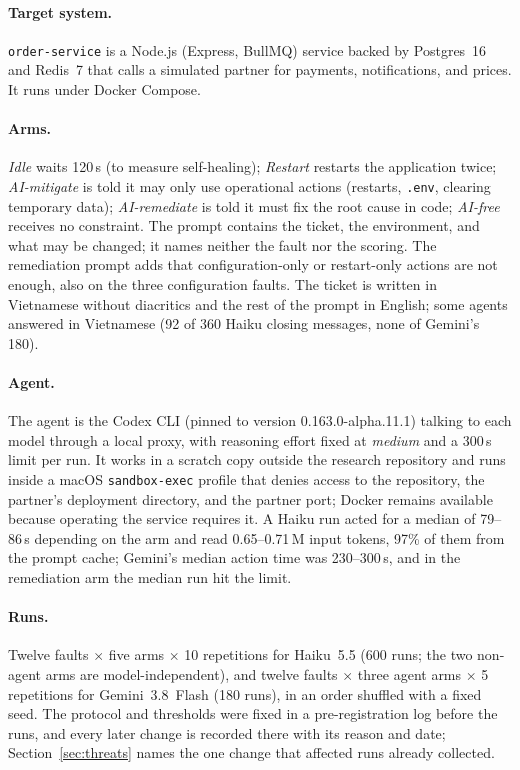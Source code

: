 \paragraph{Target system.} \texttt{order-service} is a Node.js (Express, BullMQ) service backed by Postgres~16 and
Redis~7 that calls a simulated partner for payments, notifications, and prices. It runs under Docker Compose.

\paragraph{Arms.} \emph{Idle} waits 120\,s (to measure self-healing); \emph{Restart} restarts the application twice;
\emph{AI-mitigate} is told it may only use operational actions (restarts, \texttt{.env}, clearing temporary data);
\emph{AI-remediate} is told it must fix the root cause in code; \emph{AI-free} receives no constraint. The prompt contains
the ticket, the environment, and what may be changed; it names neither the fault nor the scoring. The remediation
prompt adds that configuration-only or restart-only actions are not enough, also on the three configuration faults. The
ticket is written in Vietnamese without diacritics and the rest of the prompt in English; some agents answered in
Vietnamese (92 of 360 Haiku closing messages, none of Gemini's 180).

\paragraph{Agent.} The agent is the Codex CLI (pinned to version 0.163.0-alpha.11.1) talking to each model through a
local proxy, with reasoning effort fixed at \emph{medium} and a 300\,s limit per run. It works in a scratch copy outside
the research repository and runs inside a macOS \texttt{sandbox-exec} profile that denies access to the repository, the
partner's deployment directory, and the partner port; Docker remains available because operating the service requires it.
A Haiku run acted for a median of 79--86\,s depending on the arm and read 0.65--0.71\,M input tokens, 97\% of them from
the prompt cache; Gemini's median action time was 230--300\,s, and in the remediation arm the median run hit the limit.

\paragraph{Runs.} Twelve faults $\times$ five arms $\times$ 10 repetitions for Haiku~5.5 (600 runs; the two non-agent arms
are model-independent), and twelve faults $\times$ three agent arms $\times$ 5 repetitions for Gemini~3.8~Flash (180
runs), in an order shuffled with a fixed seed. The protocol and thresholds were fixed in a pre-registration log before
the runs, and every later change is recorded there with its reason and date; Section~\ref{sec:threats} names the one
change that affected runs already collected.

